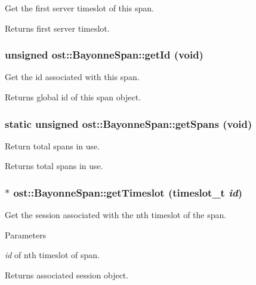 Get the first server timeslot of this span. \begin{DoxyReturn}{Returns}
first server timeslot. 
\end{DoxyReturn}
\subsubsection[{getId}]{\setlength{\rightskip}{0pt plus 5cm}unsigned ost::BayonneSpan::getId (void)\hspace{0.3cm}{\ttfamily  [inline]}}\label{classost_1_1_bayonne_span_a22da21646d6028c9d897b3608c6178c1}


Get the id associated with this span. \begin{DoxyReturn}{Returns}
global id of this span object. 
\end{DoxyReturn}
\subsubsection[{getSpans}]{\setlength{\rightskip}{0pt plus 5cm}static unsigned ost::BayonneSpan::getSpans (void)\hspace{0.3cm}{\ttfamily  [inline, static]}}\label{classost_1_1_bayonne_span_ab06a9bf98317ac81e8c31323522f30c9}


Return total spans in use. \begin{DoxyReturn}{Returns}
total spans in use. 
\end{DoxyReturn}
\subsubsection[{getTimeslot}]{$\ast$ ost::BayonneSpan::getTimeslot ({\bf timeslot\_\-t} {\em id})}\label{classost_1_1_bayonne_span_a14299e0362404bbc333a519278192989}


Get the session associated with the nth timeslot of the span. 
\begin{DoxyParams}{Parameters}
\item[{\em id}]of nth timeslot of span. \end{DoxyParams}
\begin{DoxyReturn}{Returns}
associated session object. 
\end{DoxyReturn}
